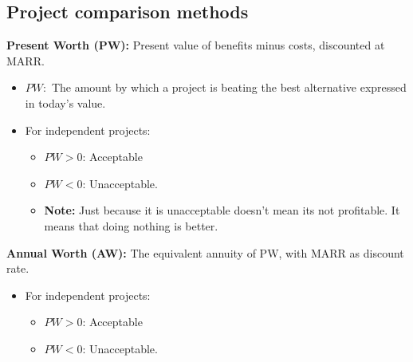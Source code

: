 \subsection{Project comparison methods}
\begin{definition}

    \textbf{Present Worth (PW):} Present value of benefits minus costs, discounted at MARR.
    \begin{itemize}
        \item $PW:$ The amount by which a project is beating the best alternative expressed in today's value.
        \item For independent projects:
            \begin{itemize}
                \item $PW > 0$: Acceptable
                \item $PW < 0$: Unacceptable.
            \end{itemize}
        \begin{itemize}
            \item \textbf{Note:} Just because it is unacceptable doesn't mean its not profitable. It means that doing nothing is better.
        \end{itemize}
    \end{itemize}
    \vspace{1em}

    \textbf{Annual Worth (AW):} The equivalent annuity of PW, with MARR as discount rate.
    \begin{itemize}
        \item For independent projects:
        \begin{itemize}
            \item $PW > 0$: Acceptable
            \item $PW < 0$: Unacceptable.
        \end{itemize}
    \end{itemize}
\end{definition}

\begin{example}
\end{example}

\begin{example}
\end{example}

